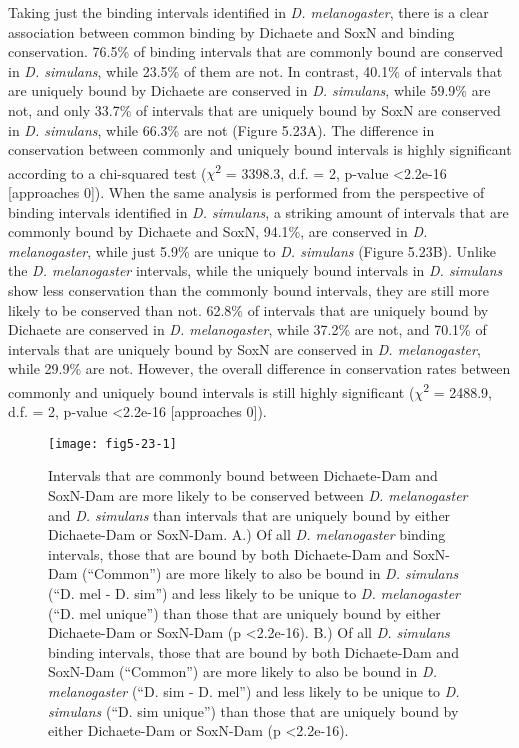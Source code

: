 Taking just the binding intervals identified in \emph{D. melanogaster}, there is a clear association between common binding by Dichaete and SoxN and binding conservation. 76.5\% of binding intervals that are commonly bound are conserved in \emph{D. simulans}, while 23.5\% of them are not. In contrast, 40.1\% of intervals that are uniquely bound by Dichaete are conserved in \emph{D. simulans}, while 59.9\% are not, and only 33.7\% of intervals that are uniquely bound by SoxN are conserved in \emph{D. simulans}, while 66.3\% are not (Figure 5.23A). The difference in conservation between commonly and uniquely bound intervals is highly significant according to a chi-squared test (\(\chi\)\textsuperscript{2} = 3398.3, d.f. = 2, p-value \textless 2.2e-16 [approaches 0]). When the same analysis is performed from the perspective of binding intervals identified in \emph{D. simulans}, a striking amount of intervals that are commonly bound by Dichaete and SoxN, 94.1\%, are conserved in \emph{D. melanogaster}, while just 5.9\% are unique to \emph{D. simulans} (Figure 5.23B). Unlike the \emph{D. melanogaster} intervals, while the uniquely bound intervals in \emph{D. simulans} show less conservation than the commonly bound intervals, they are still more likely to be conserved than not. 62.8\% of intervals that are uniquely bound by Dichaete are conserved in \emph{D. melanogaster}, while 37.2\% are not, and 70.1\% of intervals that are uniquely bound by SoxN are conserved in \emph{D. melanogaster}, while 29.9\% are not. However, the overall difference in conservation rates between commonly and uniquely bound intervals is still highly significant (\(\chi\)\textsuperscript{2} = 2488.9, d.f. = 2, p-value \textless 2.2e-16 [approaches 0]).

\begin{figure}
\centering
\texttt{[image: fig5-23-1]}
\caption[Intervals that are commonly bound between Dichaete-Dam and SoxN-Dam are more likely to be conserved between \emph{D. melanogaster} and \emph{D. simulans} than intervals that are uniquely bound by either Dichaete-Dam or SoxN-Dam]{Intervals that are commonly bound between Dichaete-Dam and SoxN-Dam are more likely to be conserved between \emph{D. melanogaster} and \emph{D. simulans} than intervals that are uniquely bound by either Dichaete-Dam or SoxN-Dam. A.) Of all \emph{D. melanogaster} binding intervals, those that are bound by both Dichaete-Dam and SoxN-Dam (“Common”) are more likely to also be bound in \emph{D. simulans} (“D. mel - D. sim”) and less likely to be unique to \emph{D. melanogaster} (“D. mel unique”) than those that are uniquely bound by either Dichaete-Dam or SoxN-Dam (p \textless 2.2e-16). B.) Of all \emph{D. simulans} binding intervals, those that are bound by both Dichaete-Dam and SoxN-Dam (“Common”) are more likely to also be bound in \emph{D. melanogaster} (“D. sim - D. mel”) and less likely to be unique to \emph{D. simulans} (“D. sim unique”) than those that are uniquely bound by either Dichaete-Dam or SoxN-Dam (p \textless 2.2e-16).}
\label{Figure 5.23}
\end{figure}

